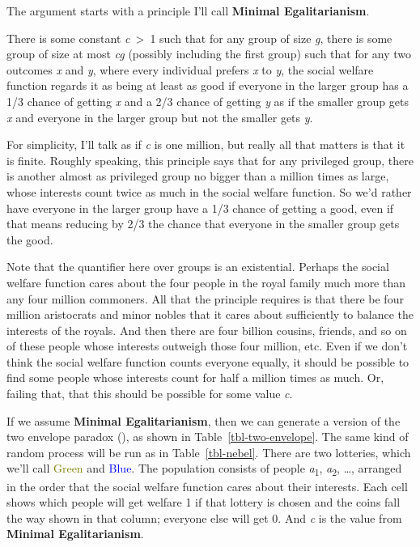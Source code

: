 \documentclass[
  11pt,
  letterpaper,
  DIV=11,
  numbers=noendperiod,
  twoside]{scrartcl}
\providecommand{\tightlist}{%
  \setlength{\itemsep}{0pt}\setlength{\parskip}{0pt}}
\begin{document}
The argument starts with a principle I'll call \textbf{Minimal
Egalitarianism}.

\begin{description}
\tightlist
\item[Minimal Egalitarianism]
There is some constant \emph{c}~\textgreater~1 such that for any group
of size \emph{g}, there is some group of size at most \emph{cg}
(possibly including the first group) such that for any two outcomes
\emph{x} and \emph{y}, where every individual prefers \emph{x} to
\emph{y}, the social welfare function regards it as being at least as
good if everyone in the larger group has a 1/3 chance of getting
\emph{x} and a 2/3 chance of getting \emph{y} as if the smaller group
gets \emph{x} and everyone in the larger group but not the smaller gets
\emph{y}.
\end{description}

For simplicity, I'll talk as if \emph{c} is one million, but really all
that matters is that it is finite. Roughly speaking, this principle says
that for any privileged group, there is another almost as privileged
group no bigger than a million times as large, whose interests count
twice as much in the social welfare function. So we'd rather have
everyone in the larger group have a 1/3 chance of getting a good, even
if that means reducing by 2/3 the chance that everyone in the smaller
group gets the good.

Note that the quantifier here over groups is an existential. Perhaps the
social welfare function cares about the four people in the royal family
much more than any four million commoners. All that the principle
requires is that there be four million aristocrats and minor nobles that
it cares about sufficiently to balance the interests of the royals. And
then there are four billion cousins, friends, and so on of these people
whose interests outweigh those four million, etc. Even if we don't think
the social welfare function counts everyone equally, it should be
possible to find some people whose interests count for half a million
times as much. Or, failing that, that this should be possible for some
value \emph{c}.

If we assume \textbf{Minimal Egalitarianism}, then we can generate a
version of the two envelope paradox (), as shown in Table~\ref{tbl-two-envelope}. The
same kind of random process will be run as in Table~\ref{tbl-nebel}.
There are two lotteries, which we'll call \textcolor{olive}{Green} and
\textcolor{blue}{Blue}. The population consists of people
\emph{a}\textsubscript{1}, \emph{a}\textsubscript{2}, \ldots, arranged
in the order that the social welfare function cares about their
interests. Each cell shows which people will get welfare 1 if that
lottery is chosen and the coins fall the way shown in that column;
everyone else will get 0. And \emph{c} is the value from \textbf{Minimal
Egalitarianism}.
\end{document}
